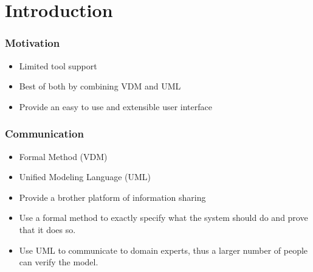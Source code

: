 %
%
\section{Introduction}
%
%
\frame
{
  \frametitle{Motivation}

\begin{center}
  \begin{itemize}
  		\item Limited tool support
  		\item Best of both by combining VDM and UML
  		\item Provide an easy to use and extensible user interface
  \end{itemize}
\end{center}
}

%
%
\frame
{
  \frametitle{Communication}


\begin{center}
  \begin{itemize}
  		\item Formal Method (VDM)
  		\item Unified Modeling Language (UML)
  		\item Provide a brother platform of information sharing
  \end{itemize}
\end{center}
}

\note
{

  \begin{itemize}
  		\item Use a formal method to exactly specify what the system should do and prove that it does so.
  		\item Use UML to communicate to domain experts, thus a larger number of people can verify the model.
  		
  \end{itemize}



}

